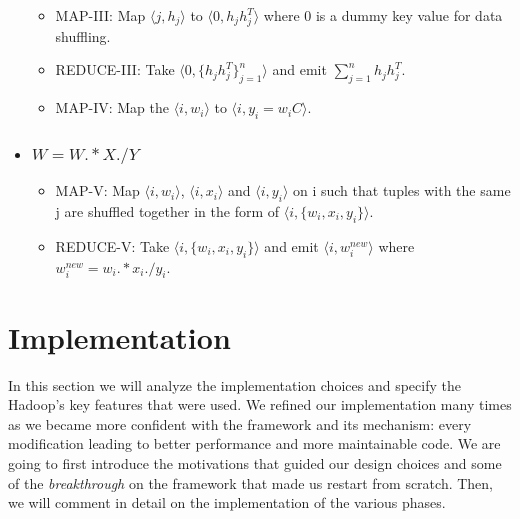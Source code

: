\documentclass[a4paper,12pt]{article}
\begin{document}
\begin{itemize}
       \begin{itemize}

         \item MAP-III: Map $\langle j, h_j \rangle$ to  $\langle 0,
           h_j h_j^T \rangle$ where 0 is a dummy key value for data
           shuffling.

          \item REDUCE-III: Take $\langle 0, \{h_j h_j^T\}_{j=1}^{n}
            \rangle $ and emit $\sum_{j=1}^{n} h_j h_j^T $.

         \item MAP-IV: Map the $ \langle i, w_i \rangle$ to $ \langle
           i, y_i = w_iC \rangle$.

       \end{itemize}


      \item \subsubsection{$ W = W .* X ./ Y $}
        \begin{itemize}

         \item MAP-V: Map $\langle i, w_i \rangle$, $\langle i, x_i
           \rangle$ and $\langle i, y_i \rangle$ on i such that tuples
           with the same j are shuffled together in the form of
           $\langle i, \{w_i, x_i, y_i\} \rangle$.

          \item REDUCE-V: Take $\langle i, \{w_i, x_i, y_i\} \rangle$
            and emit $\langle i, w_i^{new} \rangle$ where $w_i^{new} =
            w_i .* x_i ./ y_i $.

       \end{itemize}

    \end{itemize}

\section{Implementation}
\label{sec:implementation}

In this section we will analyze the implementation choices and specify the Hadoop's key features that were used. 
We refined our implementation many times as we became more confident with the framework and its mechanism: every modification leading to better performance and more maintainable code.
We are going to first introduce the motivations that guided our design choices and some of the \textit{breakthrough} on the framework that made us restart from scratch.
Then, we will comment in detail on the implementation of the various phases.
\end{document}
